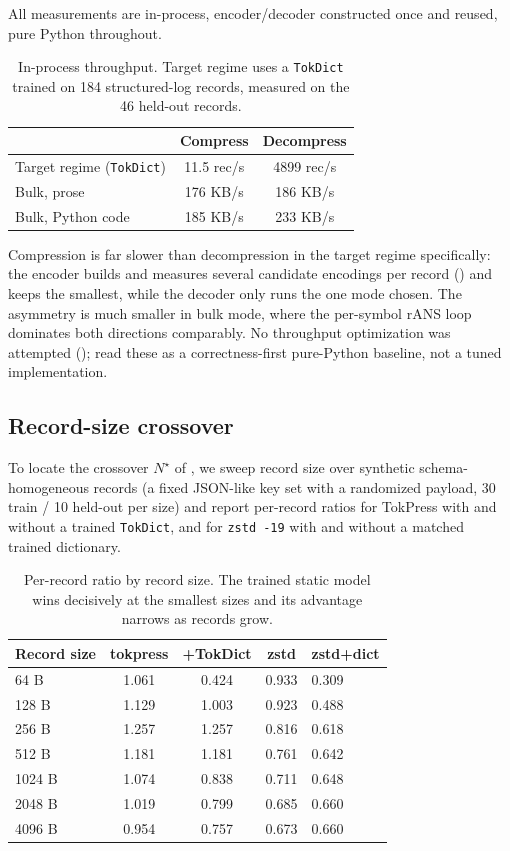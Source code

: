 \documentclass[10pt,twocolumn]{article}
\theoremstyle{plain}
\theoremstyle{definition}
\begin{document}
All measurements are in-process, encoder/decoder constructed once and reused, pure
Python throughout.

\begin{table}[h]
\centering\small
\caption{In-process throughput. Target regime uses a \texttt{TokDict} trained on
184 structured-log records, measured on the 46 held-out records.}
\label{tab:speed}
\begin{tabular}{@{}p{3.4cm}cc@{}}
\toprule
 & Compress & Decompress \\
\midrule
Target regime (\texttt{TokDict}) & 11.5 rec/s & 4899 rec/s \\
Bulk, prose & 176 KB/s & 186 KB/s \\
Bulk, Python code & 185 KB/s & 233 KB/s \\
\bottomrule
\end{tabular}
\end{table}

Compression is far slower than decompression in the target regime specifically: the
encoder builds and measures several candidate encodings per record ()
and keeps the smallest, while the decoder only runs the one mode chosen. The asymmetry
is much smaller in bulk mode, where the per-symbol rANS loop dominates both directions
comparably. No throughput optimization was attempted (); read these
as a correctness-first pure-Python baseline, not a tuned implementation.

\subsection{Record-size crossover}\label{sec:sweep}

To locate the crossover $N^\star$ of , we sweep record size over
synthetic schema-homogeneous records (a fixed JSON-like key set with a randomized
payload, 30 train / 10 held-out per size) and report per-record ratios for TokPress
with and without a trained \texttt{TokDict}, and for \texttt{zstd -19} with and
without a matched trained dictionary.

\begin{table}[h]
\centering\small
\caption{Per-record ratio by record size. The trained static model wins decisively at
the smallest sizes and its advantage narrows as records grow.}
\label{tab:sweep}
\begin{tabular}{@{}lcccl@{}}
\toprule
Record size & tokpress & +TokDict & zstd & zstd+dict \\
\midrule
64 B   & 1.061 & 0.424 & 0.933 & 0.309 \\
128 B  & 1.129 & 1.003 & 0.923 & 0.488 \\
256 B  & 1.257 & 1.257 & 0.816 & 0.618 \\
512 B  & 1.181 & 1.181 & 0.761 & 0.642 \\
1024 B & 1.074 & 0.838 & 0.711 & 0.648 \\
2048 B & 1.019 & 0.799 & 0.685 & 0.660 \\
4096 B & 0.954 & 0.757 & 0.673 & 0.660 \\
\bottomrule
\end{tabular}
\end{table}
\end{document}
